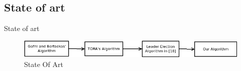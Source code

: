 \documentclass{beamer}
\begin{document}
\subsection{State of art}
\begin{frame}{State of art}
	
\begin{figure}
	\centering
	\includegraphics[width=1\linewidth]{state_of_art}
	\caption[State Of Art]{State Of Art}
	\label{fig:stateofart}
\end{figure}

\end{frame}

\end{document}
